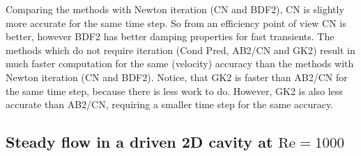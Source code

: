 \begin{table}[htb!]
\begin{center}
\end{center}
\end{table}

Comparing the methods with Newton iteration (CN and BDF2), CN is slightly more accurate for the same time step.
So from an efficiency point of view CN is better, however BDF2 has better damping
properties for fast transients.
The methods which do not require iteration (Cond Pred, AB2/CN and GK2) result in much faster computation
for the same (velocity) accuracy than
the methods with Newton iteration (CN and BDF2). Notice, that GK2 is faster than AB2/CN for the same time step, because there
is less work to do. However, GK2 is also less accurate than AB2/CN, requiring a smaller time step for the same accuracy.

\subsection{Steady flow in a driven 2D cavity at $\mathrm{Re}=1000$}
\label{sec:nssteady2D}


